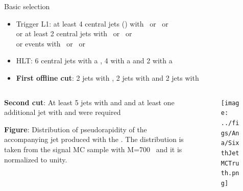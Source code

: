 \begin{frame}{Basic selection}
\vspace{-.2cm}

\begin{block}{}
  \begin{itemize}\scriptsize
  \item Trigger L1: at least 4 central jets () with ~or ~or  \\
                    or at least 2 central jets with ~or ~or  \\
                    or events with ~or ~or 
  \item HLT: 6 central jets with a , 4 with a  and 2 with a 
  \item \textbf{First offline cut}: 2 jets with , 2 jets with  and 2 jets with 
  \end{itemize}
\end{block}

\begin{columns}
\begin{column}{.50\textwidth}
\vspace{-.2cm}
\begin{block}{}
  \scriptsize \textbf{Second cut}: At least 5 jets with  and  and at least one additional jet with  and  were required
\end{block}

\vspace{-.2cm}
\begin{block}{}
\scriptsize \textbf{Figure}: Distribution of pseudorapidity of the accompanying jet produced with the \Tp. The distribution is taken from the signal MC sample with M=700 \GeVcc~and it is normalized to unity.
\end{block}
\end{column}

\begin{column}{.50\textwidth}
\vspace{-.2cm}
\begin{figure}[!Hhtbp]
  \begin{center}
    \texttt{[image: ../figs/Ana/SixthJetMCTruth.png]}
  \end{center}
\end{figure}
\end{column}
\end{columns}

\end{frame}


